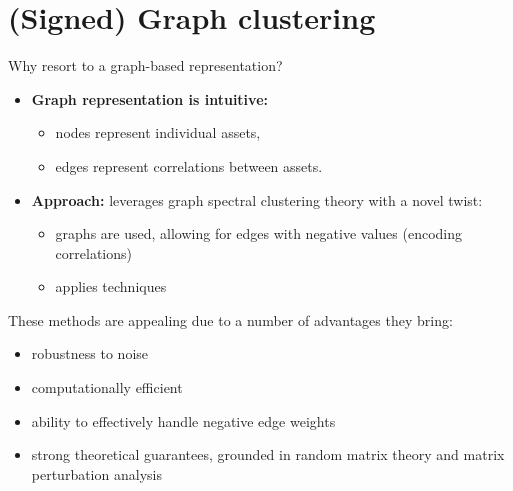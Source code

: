 \documentclass[dvipsnames,mathserif]{beamer}
\newcommand\mypv{\vfill \ifthenelse{\boolean{withPause}}{ \pause }{}}
\begin{document}
\section{(Signed) Graph clustering}
\begin{frame}{Why resort to a graph-based representation?}
\vfill

\begin{itemize}
    \item \textbf{Graph representation is intuitive:}
        \begin{itemize}
            \item nodes represent individual assets,
            \item edges represent correlations between assets.
        \end{itemize}
    \item \textbf{Approach:} leverages graph spectral clustering theory with a novel twist:
        \begin{itemize}
            \item {}  graphs are used, allowing for edges with negative values (encoding correlations)
            \item applies  techniques
        \end{itemize}
\end{itemize}

\mypv  

These methods are appealing due to a number of advantages they bring:
\begin{itemize}
\item robustness to noise
\item computationally efficient 
\item ability to effectively handle negative edge weights
\item strong theoretical guarantees, grounded in random matrix theory and matrix perturbation analysis
\end{itemize}

\vfill 
\end{frame}
\end{document}
